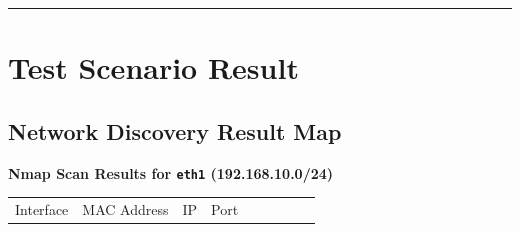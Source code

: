 \begin{center}
            \rule{0.5\linewidth}{0.5pt}
\end{center}


\section{Test Scenario Result}\label{test-scenario-result}

\subsection{Network Discovery Result
Map}\label{network-discovery-result-map}

\textbf{Nmap Scan Results for \texttt{eth1} (192.168.10.0/24)}

\begin{longtable}[]{@{}
        >{\raggedright\arraybackslash}p{}
        >{\raggedright\arraybackslash}p{}
        >{\raggedright\arraybackslash}p{}
        >{\raggedleft\arraybackslash}p{}
        >{\raggedright\arraybackslash}p{}
        >{\raggedright\arraybackslash}p{}
        >{\raggedright\arraybackslash}p{}
        >{\raggedright\arraybackslash}p{}
        >{\raggedright\arraybackslash}p{}@{}}
    \toprule\noalign{}
    \begin{minipage}[b]{\linewidth}
                \raggedright
            Interface
    \end{minipage} & \begin{minipage}[b]{\linewidth}
                                 \raggedright
                             MAC Address
    \end{minipage} & \begin{minipage}[b]{\linewidth}
                                 \raggedright
                             IP
    \end{minipage} & \begin{minipage}[b]{\linewidth}
                                 \raggedleft
                             Port
    \end{minipage} & \begin{minipage}[b]{\linewidth}
                                 \raggedright

\end{minipage}
\end{longtable}
